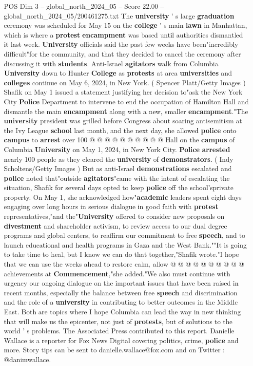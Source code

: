 \begin{textsample}{POS Dim 3 – global\_north\_2024\_05 – Score 22.00 – global\_north\_2024\_05/200461275.txt}
The \textbf{university} ' s large \textbf{graduation} ceremony was scheduled for May 15 on the \textbf{college} ' s main \textbf{lawn} in Manhattan, which is where a \textbf{protest} \textbf{encampment} was based until authorities dismantled it last week. \textbf{University} officials said the past few weeks have been"incredibly difficult"for the community, and that they decided to cancel the ceremony after discussing it with \textbf{students}.
Anti-Israel \textbf{agitators} walk from Columbia \textbf{University} down to Hunter \textbf{College} as \textbf{protests} at area \textbf{universities} and \textbf{colleges} continue on May 6, 2024, in New York. ( Spencer Platt/Getty Images ) Shafik on May 1 issued a statement justifying her decision to"ask the New York City \textbf{Police} Department to intervene to end the occupation of Hamilton Hall and dismantle the main \textbf{encampment} along with a new, smaller \textbf{encampment}."The \textbf{university} president was grilled before Congress about soaring antisemitism at the Ivy League \textbf{school} last month, and the next day, she allowed \textbf{police} onto \textbf{campus} to \textbf{arrest} over 100 @ @ @ @ @ @ @ @ @ @ Hall on the \textbf{campus} of Columbia \textbf{University} on May 1, 2024, in New York City. \textbf{Police} \textbf{arrested} nearly 100 people as they cleared the \textbf{university} of \textbf{demonstrators}. ( Indy Scholtens/Getty Images ) But as anti-Israel \textbf{demonstrations} escalated and \textbf{police} noted that"outside \textbf{agitators}"came with the intent of escalating the situation, Shafik for several days opted to keep \textbf{police} off the school'sprivate property.
On May 1, she acknowledged how"\textbf{academic} leaders spent eight days engaging over long hours in serious dialogue in good faith with \textbf{protest} representatives,"and the"\textbf{University} offered to consider new proposals on \textbf{divestment} and shareholder activism, to review access to our dual degree programs and global centers, to reaffirm our commitment to free \textbf{speech}, and to launch educational and health programs in Gaza and the West Bank.""It is going to take time to heal, but I know we can do that together,"Shafik wrote."I hope that we can use the weeks ahead to restore calm, allow @ @ @ @ @ @ @ @ @ @ achievements at \textbf{Commencement},"she added."We also must continue with urgency our ongoing dialogue on the important issues that have been raised in recent months, especially the balance between free \textbf{speech} and discrimination and the role of a \textbf{university} in contributing to better outcomes in the Middle East.
Both are topics where I hope Columbia can lead the way in new thinking that will make us the epicenter, not just of \textbf{protests}, but of solutions to the world ' s problems.
The Associated Press contributed to this report.
Danielle Wallace is a reporter for Fox News Digital covering politics, crime, \textbf{police} and more.
Story tips can be sent to danielle.wallace@fox.com and on Twitter : @danimwallace.


\end{textsample}
